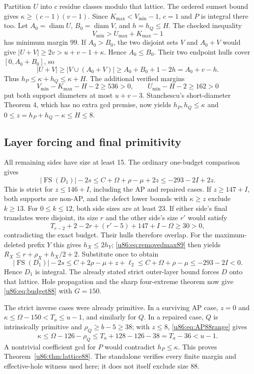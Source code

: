 \documentclass[11pt,a4paper]{article}
\theoremstyle{remark}
\newcommand{\FS}{\operatorname{FS}}
\begin{document}
Partition $U$ into $c$ residue classes modulo that lattice.
The ordered sumset bound gives $\kappa\ge(c-1)(v-1)$.
Since $K_{\max}<V_{\min}-1$, $c=1$ and $P$ is integral there too.
Let $A_0=\operatorname{diam}U$, $B_0=\operatorname{diam}V$, and
$h=h_Q\le H$. The checked inequality
\[
 V_{\min}>U_{\max}+K_{\max}-1
\]
has minimum margin 99. If $A_0>B_0$, the two disjoint sets
$V$ and $A_0+V$ would give $|U+V|\ge2v>u+v-1+\kappa$.
Hence $A_0\le B_0$. Their two endpoint hulls cover $[0,A_0+B_0]$,
so
\[
 |U+V|\ge|V\cup(A_0+V)|\ge A_0+B_0+1-2h=A_0+v-h.
\]
Thus $h_P\le\kappa+h_Q\le\kappa+H$.
The additional verified margins
\[
 V_{\min}-K_{\max}-H-2\ge536>0,
 \qquad U_{\min}-H-2\ge162>0
\]
put both support diameters at most $u+v-3$.
Stanchescu's short-diameter Theorem 4, which has no extra gcd premise,
now yields $h_P,h_Q\le\kappa$ and
$0\le z=h_P+h_Q-\kappa\le H\le8$.

\subsection{Layer forcing and final primitivity}
All remaining sides have size at least 15. The ordinary one-budget
comparison gives
\[
 |\FS(D_1)|-2s\le C+\Omega+\rho-\mu+2z
                    \le-293-2I+2z.
\]
This is strict for $z\le146+I$, including the AP and repaired cases.
If $z\ge147+I$, both supports are non-AP, and the defect lower bounds
with $\kappa\ge z$ exclude $k\ge13$.
For $0\le k\le12$, both side sizes are at least 23.
If either side's final translates were disjoint, its size $r$ and the
other side's size $r'$ would satisfy
\[
 T_{r-2}+2-2r+(r'-5)+147+I-\Omega\ge30>0,
\]
contradicting the exact budget. Their hulls therefore overlap.
For the maximum-deleted prefix $Y$ this gives $h_X\le2h_Y$;
\eqref{u86:eq:removedmax89} then yields
$R_X\le r+\rho_X+h_X/2+2$. Substitute once to obtain
\[
 |\FS(D_1)|-2s\le C+2\rho-\mu+z+\ell_2
       \le C+\Omega+\rho-\mu\le-293-2I<0.
\]
Hence $D_1$ is integral. The already stated strict outer-layer bound
forces $D$ onto that lattice. Hole propagation and the sharp
four-extreme theorem now give \eqref{u86:eq:budget88} with $G=150$.

The strict inverse cases were already primitive. In a surviving AP
case, $z=0$ and
$\kappa\le\Omega-150<T_a\le u-1$, and similarly for $Q$.
In a repaired case, $Q$ is intrinsically primitive and $\rho_Q\ge b-5\ge38$;
with $z\le8$, \eqref{u86:eq:AP88range} gives
\[
 \kappa\le\Omega-126-\rho_Q\le T_a+128-126-38=T_a-36<u-1.
\]
A nontrivial coefficient gcd for $P$ would contradict $h_P\le\kappa$.
This proves Theorem~\ref{u86:thm:lattice88}.
The standalone  verifies every finite margin and
effective-hole witness used here; it does not itself exclude size 88.
\end{document}
